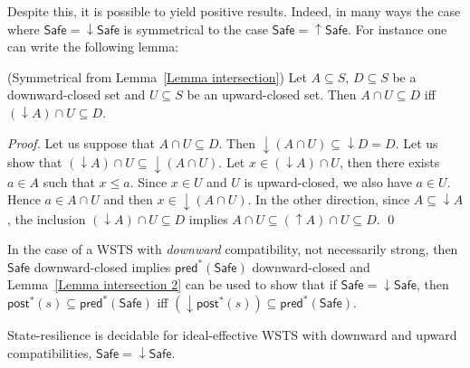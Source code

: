 \documentclass[runningheads]{llncs}
\newcommand{\pred}{\textsf{pred}}
\newcommand{\post}{\textsf{post}}
\newcommand{\Bad}{\textsf{Bad}}
\newcommand{\Safe}{\textsf{Safe}}
\begin{document}
Despite this, it is possible to yield positive results. Indeed, in many ways the case where $\Safe = \downarrow \Safe$
is symmetrical to the case $\Safe = \uparrow \Safe$.
%
For instance one can write the following lemma:

\begin{lemma}(Symmetrical from Lemma~\ref{Lemma intersection})\label{Lemma intersection 2}
Let $A \subseteq S$, $D \subseteq S$ be a downward-closed set and $U \subseteq S$ be an upward-closed set. 
Then $A \cap U \subseteq D$  iff $ (\downarrow  A) \cap U \subseteq D$.
\end{lemma}

\begin{proof}
Let us suppose that $A \cap U \subseteq D$. Then ${\downarrow (A \cap U)} \subseteq {\downarrow D} = D$. Let us show that $({\downarrow A}) \cap U \subseteq {\downarrow (A \cap U)}$. Let $x \in ({\downarrow A}) \cap U$, then there exists $a \in A$ such that $x \leq a$. Since $x \in U$ and $U$ is upward-closed, we also have $a \in U$. Hence $a \in A \cap U$ and then $x \in { \downarrow (A \cap U)}$. In the other direction, since $A \subseteq {\downarrow A}$, the inclusion $({\downarrow  A}) \cap U \subseteq D$ implies $A \cap U \subseteq ({\uparrow  A}) \cap U \subseteq D$. \qed
\end{proof}


In the case of a WSTS with \emph{downward} compatibility, not necessarily strong,
then $\Safe$ downward-closed implies $\pred^*(\Safe)$ downward-closed and
Lemma~\ref{Lemma intersection 2} can be used to show that
if $\Safe = \downarrow \Safe$,
then
$\post^*(s) %
\subseteq \pred^*(\Safe)$  iff $ (\downarrow  \post^*(s)) 
\subseteq \pred^*(\Safe)$.


\begin{theorem}\label{downward srp}
{\sc State-resilience} is decidable for ideal-effective WSTS with downward and upward compatibilities,
$\Safe = \downarrow \Safe$.
\end{theorem}
\end{document}
